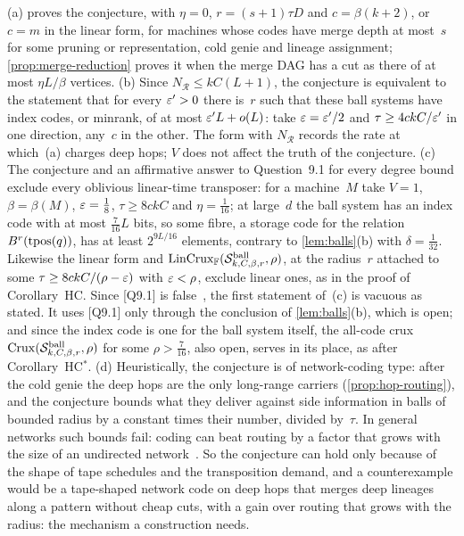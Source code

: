 \begin{remark}[On Conjecture HV$^*$]\label{rem:HV}
(a)  proves the conjecture, with $\eta=0$, $r=(s+1)\tau D$ and $c=\beta(k+2)$, or $c=m$ in the
linear form, for machines whose codes have merge depth at most~$s$ for some pruning or representation, cold genie and
lineage assignment; \cref{prop:merge-reduction} proves it when the merge DAG has a cut as there of at most $\eta L/\beta$
vertices. (b) Since $N_{\mathcal R}\le kC(L+1)$, the conjecture is equivalent to the statement that for every
$\varepsilon'>0$ there is~$r$ such that these ball systems have index codes, or minrank, of at most $\varepsilon'L+o(L)$: take
$\varepsilon=\varepsilon'/2$ and $\tau\ge4ckC/\varepsilon'$ in one direction, any~$c$ in the other. The form with $N_{\mathcal R}$ records the
rate at which~(a) charges deep hops; $V$ does not affect the truth of the conjecture. (c) The conjecture and an
affirmative answer to Question~9.1 for every degree bound exclude every oblivious linear-time transposer: for a
machine~$M$ take $V=1$, $\beta=\beta(M)$, $\varepsilon=\frac18$, $\tau\ge8ckC$ and $\eta=\frac1{16}$; at large~$d$ the
ball system has an index code with at most $\frac7{16}L$ bits, so some fibre, a storage code for the relation
$B^r(\operatorname{tpos}(q))$, has at least $2^{9L/16}$ elements, contrary to \cref{lem:balls}(b) with $\delta=\frac1{32}$. Likewise the
linear form and $\mathrm{LinCrux}_{\mathbb{F}}(\mathcal S^{\mathrm{ball}}_{k,C,\beta,r},\rho)$, at the radius~$r$ attached to some $\tau\ge8ckC/(\rho-\varepsilon)$
with $\varepsilon<\rho$, exclude linear ones, as in the proof of Corollary~HC. Since [Q9.1] is
false~\cite{StorageCodes2026}, the first statement of~(c) is vacuous as stated. It uses [Q9.1] only through the
conclusion of \cref{lem:balls}(b), which is open; and since the index code is one for the ball system itself, the
all-code crux $\mathrm{Crux}(\mathcal S^{\mathrm{ball}}_{k,C,\beta,r},\rho)$ for some $\rho>\frac7{16}$, also open, serves in its place, as after
Corollary~HC$^*$. (d) Heuristically, the conjecture is of
network-coding type: after the cold genie the deep hops are the only long-range carriers (\cref{prop:hop-routing}), and
the conjecture bounds what they deliver against side information in balls of bounded radius by a constant times their
number, divided by~$\tau$. In general networks such bounds fail: coding can beat routing by a factor that grows with the
size of an undirected network~\cite{BravermanHe2026}. So the conjecture can hold only because of the shape of tape
schedules and the transposition demand, and a counterexample would be a tape-shaped network code on deep hops that merges
deep lineages along a pattern without cheap cuts, with a gain over routing that grows with the radius: the mechanism a
construction needs.
\end{remark}
